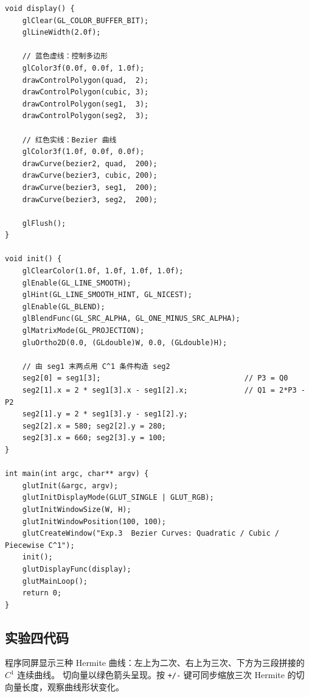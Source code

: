 \documentclass[a4paper,12pt]{ctexart}
\begin{document}
\begin{lstlisting}[style=cppstyle,caption={Bezier 曲线生成 —— 完整源代码}]
void display() {
    glClear(GL_COLOR_BUFFER_BIT);
    glLineWidth(2.0f);

    // 蓝色虚线：控制多边形
    glColor3f(0.0f, 0.0f, 1.0f);
    drawControlPolygon(quad,  2);
    drawControlPolygon(cubic, 3);
    drawControlPolygon(seg1,  3);
    drawControlPolygon(seg2,  3);

    // 红色实线：Bezier 曲线
    glColor3f(1.0f, 0.0f, 0.0f);
    drawCurve(bezier2, quad,  200);
    drawCurve(bezier3, cubic, 200);
    drawCurve(bezier3, seg1,  200);
    drawCurve(bezier3, seg2,  200);

    glFlush();
}

void init() {
    glClearColor(1.0f, 1.0f, 1.0f, 1.0f);
    glEnable(GL_LINE_SMOOTH);
    glHint(GL_LINE_SMOOTH_HINT, GL_NICEST);
    glEnable(GL_BLEND);
    glBlendFunc(GL_SRC_ALPHA, GL_ONE_MINUS_SRC_ALPHA);
    glMatrixMode(GL_PROJECTION);
    gluOrtho2D(0.0, (GLdouble)W, 0.0, (GLdouble)H);

    // 由 seg1 末两点用 C^1 条件构造 seg2
    seg2[0] = seg1[3];                                 // P3 = Q0
    seg2[1].x = 2 * seg1[3].x - seg1[2].x;             // Q1 = 2*P3 - P2
    seg2[1].y = 2 * seg1[3].y - seg1[2].y;
    seg2[2].x = 580; seg2[2].y = 280;
    seg2[3].x = 660; seg2[3].y = 100;
}

int main(int argc, char** argv) {
    glutInit(&argc, argv);
    glutInitDisplayMode(GLUT_SINGLE | GLUT_RGB);
    glutInitWindowSize(W, H);
    glutInitWindowPosition(100, 100);
    glutCreateWindow("Exp.3  Bezier Curves: Quadratic / Cubic / Piecewise C^1");
    init();
    glutDisplayFunc(display);
    glutMainLoop();
    return 0;
}
\end{lstlisting}

\subsection{实验四代码}

程序同屏显示三种 Hermite 曲线：左上为二次、右上为三次、下方为三段拼接的 $C^1$ 连续曲线。
切向量以绿色箭头呈现。按 \texttt{+/-} 键可同步缩放三次 Hermite 的切向量长度，观察曲线形状变化。
\end{document}
